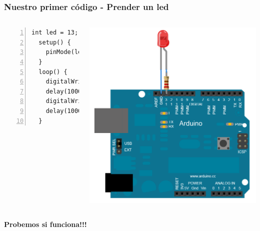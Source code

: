 \documentclass[compress]{beamer}
\begin{document}
\begin{frame}[fragile]
\frametitle{Nuestro primer código - Prender un led}

\begin{columns}
  \begin{Verbatim}[formatcom=\color{red},fontseries=b, numbers=left,numbersep=3pt]
  int led = 13;
  setup() {
    pinMode(led, OUTPUT);
  }
  loop() {
    digitalWrite(led, HIGH);
    delay(1000);
    digitalWrite(led, LOW);
    delay(1000);
  }
  \end{Verbatim} 

   \includegraphics[width=\columnwidth]{./img/arduino_led.png}

\end{columns}


 \begin{center}
 \vspace{0.5cm}
 \textbf{Probemos si funciona!!!}
 \end{center}

\end{frame}
\end{document}
